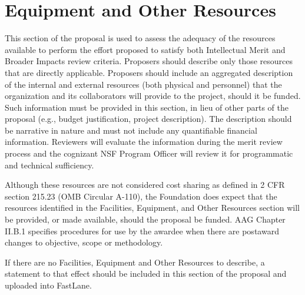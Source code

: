 \documentclass[11pt]{article}
\begin{document}
\section*{Equipment and Other Resources }

This section of the proposal is used to assess the adequacy of the resources available to perform the effort
proposed to satisfy both Intellectual Merit and Broader Impacts review criteria. Proposers should describe only
those resources that are directly applicable. Proposers should include an aggregated description of the internal
and external resources (both physical and personnel) that the organization and its collaborators will provide to
the project, should it be funded. Such information must be provided in this section, in lieu of other parts of the
proposal (e.g., budget justification, project description). The description should be narrative in nature and must
not include any quantifiable financial information. Reviewers will evaluate the information during the merit review
process and the cognizant NSF Program Officer will review it for programmatic and technical sufficiency.


Although these resources are not considered cost sharing as defined in 2 CFR section 215.23 (OMB Circular A-110),
the Foundation does expect that the resources identified in the Facilities, Equipment, and Other Resources
section will be provided, or made available, should the proposal be funded. AAG Chapter II.B.1 specifies
procedures for use by the awardee when there are postaward changes to objective, scope or methodology.


If there are no Facilities, Equipment and Other Resources to describe, a statement to that effect should
be included in this section of the proposal and uploaded into FastLane.
\end{document}
